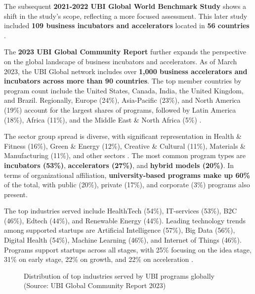 \documentclass[../Main.tex]{subfiles}%
\begin{document}
	The subsequent \textbf{2021-2022 UBI Global World Benchmark Study} shows a shift in the study's scope, reflecting a more focused assessment. This later study included \textbf{109 business incubators and accelerators} located in \textbf{56 countries} \autocite{ubi2021world}.

	The \textbf{2023 UBI Global Community Report} further expands the perspective on the global landscape of business incubators and accelerators. As of March 2023, the UBI Global network includes over \textbf{1,000 business accelerators and incubators across more than 90 countries}. The top member countries by program count include the United States, Canada, India, the United Kingdom, and Brazil. Regionally, Europe (24\%), Asia-Pacific (23\%), and North America (19\%) account for the largest shares of programs, followed by Latin America (18\%), Africa (11\%), and the Middle East \& North Africa (5\%) \autocite{Amin2024Incubators}.

	The sector group spread is diverse, with significant representation in Health \& Fitness (16\%), Green \& Energy (12\%), Creative \& Cultural (11\%), Materials \& Manufacturing (11\%), and other sectors \autocite{Amin2024Incubators}. The most common program types are \textbf{incubators (53\%)}, \textbf{accelerators (27\%)}, and \textbf{hybrid models (20\%)}. In terms of organizational affiliation, \textbf{university-based programs make up 60\%} of the total, with public (20\%), private (17\%), and corporate (3\%) programs also present.

	The top industries served include HealthTech (54\%), IT-services (53\%), B2C (46\%), Edtech (44\%), and Renewable Energy (44\%). Leading technology trends among supported startups are Artificial Intelligence (57\%), Big Data (56\%), Digital Health (54\%), Machine Learning (46\%), and Internet of Things (46\%). Programs support startups across all stages, with 25\% focusing on the idea stage, 31\% on early stage, 22\% on growth, and 22\% on acceleration \autocite{Amin2024Incubators}.

	\begin{figure}[h]
		\centering
		\caption{Distribution of top industries served by UBI programs globally (Source: UBI Global Community Report 2023)}
		\label{fig:top_industries}
	\end{figure}
\end{document}
